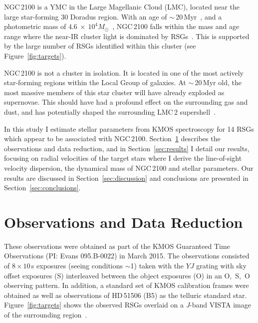 NGC\,2100 is a YMC in the Large Magellanic Cloud (LMC), located near the large star-forming 30 Doradus region.
With an age of $\sim$\,20\,Myr~\citep{1991ApJS...76..185E,2015A&A...575A..62N}, and a photometric mass of $4.6~\times~10^4M_{\odot}$~\citep[assuming~\cite{1966AJ.....71...64K} profiles]{2005ApJS..161..304M}, NGC\,2100 falls within the mass and age range where the near-IR cluster light is dominated by RSGs~\citep{2013MNRAS.430L..35G}.
This is supported by the large number of RSGs identified within this cluster (see Figure~\ref{fig:targets}).

NGC\,2100 is not a cluster in isolation.
It is located in one of the most actively star-forming regions within the Local Group of galaxies.
At $\sim$\,20\,Myr old, the most massive members of this star cluster will have already exploded as supernovae.
This should have had a profound effect on the surrounding gas and dust, and has potentially shaped the surrounding LMC\,2 supershell~\citep[see][]{1999ApJ...518..298P}.

In this study I estimate stellar parameters from KMOS spectroscopy for 14 RSGs which appear to be associated with NGC\,2100.
Section~\ref{sec:observations} describes the observations and data reduction, and in Section~\ref{sec:results} I detail our results, focusing on radial velocities of the target stars where I derive the line-of-sight velocity dispersion,
the dynamical mass of NGC\,2100 and stellar parameters.
Our results are discussed in Section~\ref{sec:discussion} and conclusions are presented in Section~\ref{sec:conclusions}.


\section{Observations and Data Reduction} %
\label{sec:observations}
These observations were obtained as part of the KMOS Guaranteed Time Observations (PI: Evans 095.B-0022) in March 2015.
The observations consisted of $8\times10$\,s exposures (seeing conditions $\sim$1) taken with the $YJ$ grating with sky offset exposures (S) interleaved between the object exposures (O) in an O,~S,~O observing pattern.
In addition, a standard set of KMOS calibration frames were obtained as well as observations of HD\,51506 (B5) as the telluric standard star.
Figure~\ref{fig:targets} shows the observed RSGs overlaid on a {\it J}-band VISTA image of the surrounding region~\citep{2011A&A...527A.116C}.

